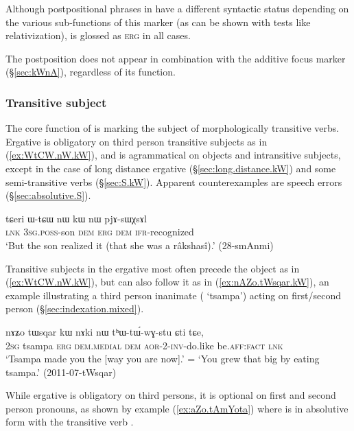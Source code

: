 Although postpositional phrases in  have a different syntactic status depending on the various sub-functions of this marker (as can be shown with tests like relativization),  is glossed as \textsc{erg} in all cases.

The postposition  does not appear in combination with the additive focus marker  (§\ref{sec:kWnA}), regardless of its function.

\subsubsection{Transitive subject} \label{sec:A.kW}
 
The core function of  is marking the subject of morphologically transitive verbs. Ergative is obligatory on third person transitive subjects as in (\ref{ex:WtCW.nW.kW}), and is agrammatical on objects and intransitive subjects, except in the case of long distance ergative (§\ref{sec:long.distance.kW}) and some semi-transitive verbs (§\ref{sec:S.kW}). Apparent counterexamples are speech errors (§\ref{sec:absolutive.S}).

\begin{exe}
\ex \label{ex:WtCW.nW.kW}
\gll tɕeri ɯ-tɕɯ nɯ kɯ nɯ pjɤ-sɯχsɤl \\
\textsc{lnk} \textsc{3sg}.\textsc{poss}-son \textsc{dem} \textsc{erg} \textsc{dem} \textsc{ifr}-recognized \\
\glt `But the son realized it (that she was a râkshasî).' (28-smAnmi)
\end{exe}

Transitive subjects in the ergative most often precede the object as in (\ref{ex:WtCW.nW.kW}), but can also follow it as in (\ref{ex:nAZo.tWsqar.kW}), an example illustrating a third person inanimate ( `tsampa') acting on first/second person (§\ref{sec:indexation.mixed}).

\begin{exe}
\ex \label{ex:nAZo.tWsqar.kW}
\gll nɤʑo tɯsqar kɯ nɤki nɯ tʰɯ-tɯ́-wɣ-stu ɕti tɕe,  \\
\textsc{2sg} tsampa \textsc{erg} \textsc{dem}.\textsc{medial} \textsc{dem} \textsc{aor}-2-\textsc{inv}-do.like be.\textsc{aff}:\textsc{fact} \textsc{lnk} \\
\glt `Tsampa made you the [way you are now].' = `You grew that big by eating tsampa.' (2011-07-tWsqar)
\end{exe}

While ergative is obligatory on third persons, it is optional on first and second person pronouns, as shown by example (\ref{ex:aZo.tAmYota}) where  is in absolutive form with the transitive verb . 

